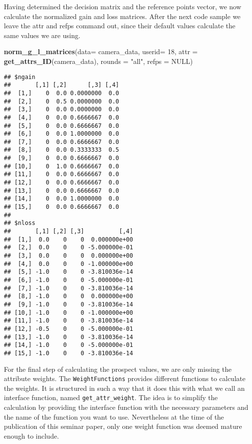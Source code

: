 \documentclass[]{article}
\newenvironment{Shaded}{\begin{snugshade}}{\end{snugshade}}
\newcommand{\KeywordTok}[1]{\textcolor[rgb]{0.13,0.29,0.53}{\textbf{{#1}}}}
\newcommand{\DataTypeTok}[1]{\textcolor[rgb]{0.13,0.29,0.53}{{#1}}}
\newcommand{\DecValTok}[1]{\textcolor[rgb]{0.00,0.00,0.81}{{#1}}}
\newcommand{\StringTok}[1]{\textcolor[rgb]{0.31,0.60,0.02}{{#1}}}
\newcommand{\OtherTok}[1]{\textcolor[rgb]{0.56,0.35,0.01}{{#1}}}
\newcommand{\NormalTok}[1]{{#1}}
\begin{document}
Having determined the decision matrix and the reference points vector,
we now calculate the normalized gain and loss matrices. After the next
code sample we leave the attr and refps command out, since their default
values calculate the same values we are using.

\begin{Shaded}
\begin{Highlighting}[]
\KeywordTok{norm_g_l_matrices}\NormalTok{(}\DataTypeTok{data=} \NormalTok{camera_data, }\DataTypeTok{userid=} \DecValTok{18}\NormalTok{,}
                              \DataTypeTok{attr =} \KeywordTok{get_attrs_ID}\NormalTok{(camera_data),  }
                              \DataTypeTok{rounds =} \StringTok{"all"}\NormalTok{,  }
                              \DataTypeTok{refps =} \OtherTok{NULL}\NormalTok{) }
\end{Highlighting}
\end{Shaded}

\begin{verbatim}
## $ngain
##       [,1] [,2]      [,3] [,4]
##  [1,]    0  0.0 0.0000000  0.0
##  [2,]    0  0.5 0.0000000  0.0
##  [3,]    0  0.0 0.0000000  0.0
##  [4,]    0  0.0 0.6666667  0.0
##  [5,]    0  0.0 0.6666667  0.0
##  [6,]    0  0.0 1.0000000  0.0
##  [7,]    0  0.0 0.6666667  0.0
##  [8,]    0  0.0 0.3333333  0.5
##  [9,]    0  0.0 0.6666667  0.0
## [10,]    0  1.0 0.6666667  0.0
## [11,]    0  0.0 0.6666667  0.0
## [12,]    0  0.0 0.6666667  0.0
## [13,]    0  0.0 0.6666667  0.0
## [14,]    0  0.0 1.0000000  0.0
## [15,]    0  0.0 0.6666667  0.0
## 
## $nloss
##       [,1] [,2] [,3]          [,4]
##  [1,]  0.0    0    0  0.000000e+00
##  [2,]  0.0    0    0 -5.000000e-01
##  [3,]  0.0    0    0  0.000000e+00
##  [4,]  0.0    0    0 -1.000000e+00
##  [5,] -1.0    0    0 -3.810036e-14
##  [6,] -1.0    0    0 -5.000000e-01
##  [7,] -1.0    0    0 -3.810036e-14
##  [8,] -1.0    0    0  0.000000e+00
##  [9,] -1.0    0    0 -3.810036e-14
## [10,] -1.0    0    0 -1.000000e+00
## [11,] -1.0    0    0 -3.810036e-14
## [12,] -0.5    0    0 -5.000000e-01
## [13,] -1.0    0    0 -3.810036e-14
## [14,] -1.0    0    0 -5.000000e-01
## [15,] -1.0    0    0 -3.810036e-14
\end{verbatim}

For the final step of calculating the prospect values, we are only
missing the attribute weights. The \texttt{WeightFunctions} provides
different functions to calculate the weights. It is structured in such a
way that it does this with what we call an interface function, named
\texttt{get\_attr\_weight}. The idea is to simplify the calculation by
providing the interface function with the necessary parameters and the
name of the function you want to use. Nevertheless at the time of the
publication of this seminar paper, only one weight function was deemed
mature enough to include.
\end{document}
